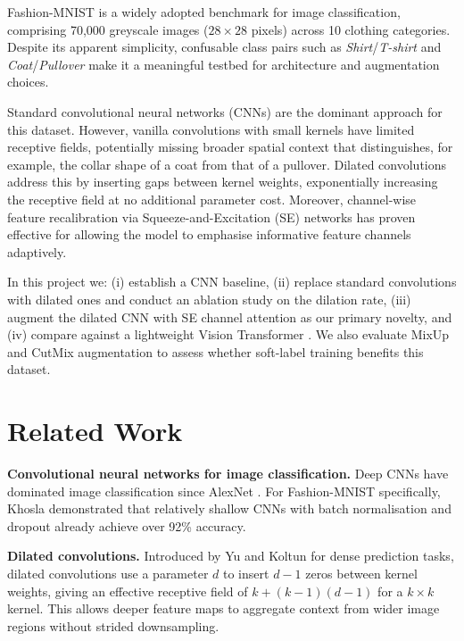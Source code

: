 \documentclass[10pt,a4paper]{article}
\begin{document}
Fashion-MNIST \cite{fashionmnist} is a widely adopted benchmark for image classification, comprising 70{,}000 greyscale images ($28\!\times\!28$ pixels) across 10 clothing categories.
Despite its apparent simplicity, confusable class pairs such as \textit{Shirt}/\textit{T-shirt} and \textit{Coat}/\textit{Pullover} make it a meaningful testbed for architecture and augmentation choices.

Standard convolutional neural networks (CNNs) are the dominant approach for this dataset.
However, vanilla convolutions with small kernels have limited receptive fields, potentially missing broader spatial context that distinguishes, for example, the collar shape of a coat from that of a pullover.
Dilated convolutions \cite{dilated} address this by inserting gaps between kernel weights, exponentially increasing the receptive field at no additional parameter cost.
Moreover, channel-wise feature recalibration via Squeeze-and-Excitation (SE) networks \cite{senet} has proven effective for allowing the model to emphasise informative feature channels adaptively.

In this project we: (i) establish a CNN baseline, (ii) replace standard convolutions with dilated ones and conduct an ablation study on the dilation rate, (iii) augment the dilated CNN with SE channel attention as our primary novelty, and (iv) compare against a lightweight Vision Transformer \cite{vit}.
We also evaluate MixUp \cite{mixup} and CutMix \cite{cutmix} augmentation to assess whether soft-label training benefits this dataset.

\section{Related Work}

\textbf{Convolutional neural networks for image classification.}
Deep CNNs have dominated image classification since AlexNet \cite{alexnet}.
For Fashion-MNIST specifically, Khosla \cite{cnnfashion} demonstrated that relatively shallow CNNs with batch normalisation and dropout already achieve over 92\% accuracy.

\textbf{Dilated convolutions.}
Introduced by Yu and Koltun \cite{dilated} for dense prediction tasks, dilated convolutions use a parameter $d$ to insert $d{-}1$ zeros between kernel weights, giving an effective receptive field of $k + (k-1)(d-1)$ for a $k\!\times\!k$ kernel.
This allows deeper feature maps to aggregate context from wider image regions without strided downsampling.
\end{document}
